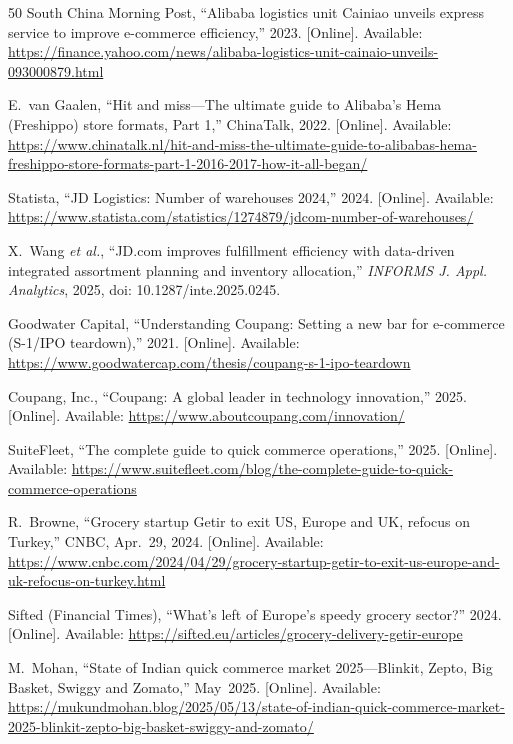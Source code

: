 \documentclass[journal]{IEEEtran}
\begin{document}
\begin{thebibliography}{50}
 South China Morning Post, ``Alibaba logistics unit Cainiao unveils express service to improve e-commerce efficiency,'' 2023. [Online]. Available: \url{https://finance.yahoo.com/news/alibaba-logistics-unit-cainaio-unveils-093000879.html}

 E.~van Gaalen, ``Hit and miss---The ultimate guide to Alibaba's Hema (Freshippo) store formats, Part 1,'' ChinaTalk, 2022. [Online]. Available: \url{https://www.chinatalk.nl/hit-and-miss-the-ultimate-guide-to-alibabas-hema-freshippo-store-formats-part-1-2016-2017-how-it-all-began/}

 Statista, ``JD Logistics: Number of warehouses 2024,'' 2024. [Online]. Available: \url{https://www.statista.com/statistics/1274879/jdcom-number-of-warehouses/}

 X.~Wang \emph{et al.}, ``JD.com improves fulfillment efficiency with data-driven integrated assortment planning and inventory allocation,'' \emph{INFORMS J. Appl. Analytics}, 2025, doi: 10.1287/inte.2025.0245.

 Goodwater Capital, ``Understanding Coupang: Setting a new bar for e-commerce (S-1/IPO teardown),'' 2021. [Online]. Available: \url{https://www.goodwatercap.com/thesis/coupang-s-1-ipo-teardown}

 Coupang, Inc., ``Coupang: A global leader in technology innovation,'' 2025. [Online]. Available: \url{https://www.aboutcoupang.com/innovation/}

 SuiteFleet, ``The complete guide to quick commerce operations,'' 2025. [Online]. Available: \url{https://www.suitefleet.com/blog/the-complete-guide-to-quick-commerce-operations}

 R.~Browne, ``Grocery startup Getir to exit US, Europe and UK, refocus on Turkey,'' CNBC, Apr.~29, 2024. [Online]. Available: \url{https://www.cnbc.com/2024/04/29/grocery-startup-getir-to-exit-us-europe-and-uk-refocus-on-turkey.html}

 Sifted (Financial Times), ``What's left of Europe's speedy grocery sector?'' 2024. [Online]. Available: \url{https://sifted.eu/articles/grocery-delivery-getir-europe}

 M.~Mohan, ``State of Indian quick commerce market 2025---Blinkit, Zepto, Big Basket, Swiggy and Zomato,'' May~2025. [Online]. Available: \url{https://mukundmohan.blog/2025/05/13/state-of-indian-quick-commerce-market-2025-blinkit-zepto-big-basket-swiggy-and-zomato/}


\end{thebibliography}
\end{document}
